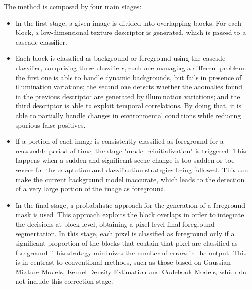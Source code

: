 \begin{itemize}
The method is composed by four main stages:
\begin{itemize}
 \item In the first stage, a given image is divided into overlapping blocks. For each block, a low-dimensional texture descriptor is generated, which is passed to a cascade classifier.
 \item Each block is classified as background or foreground using the cascade classifier, comprising three 
classifiers, each one managing a different problem: the first one is able to handle dynamic backgrounds, but 
fails in presence of illumination variations; the second one detects whether the anomalies found in the previous 
descriptor are generated by illumination variations; and the third descriptor is able to exploit temporal correlations. 
By doing that, it is able to partially handle changes in environmental conditions while reducing spurious false 
positives.
 \item If a portion of each image is consistently classified as foreground for a reasonable period of time, the 
stage "model reinitialization" is triggered. This happens when a sudden and significant scene change is too sudden or 
too severe for the adaptation and classification strategies being followed. This can make the current background model 
inaccurate, which leads to the detection of a very large portion of the image as foreground.
 \item In the final stage, a probabilistic approach for the generation of a foreground mask is used. This approach 
exploits the block overlaps in order to integrate the decisions at block-level, obtaining a pixel-level final 
foreground segmentation. In this stage, each pixel is classified as foreground only if a significant proportion of the 
blocks that contain that pixel are classified as foreground. This strategy minimizes the number of errors in the 
output. This is in contrast to conventional methods, such as those based on Gaussian Mixture Models, Kernel Density 
Estimation and Codebook Models, which do not include this correction stage.
\end{itemize}


\end{itemize}
